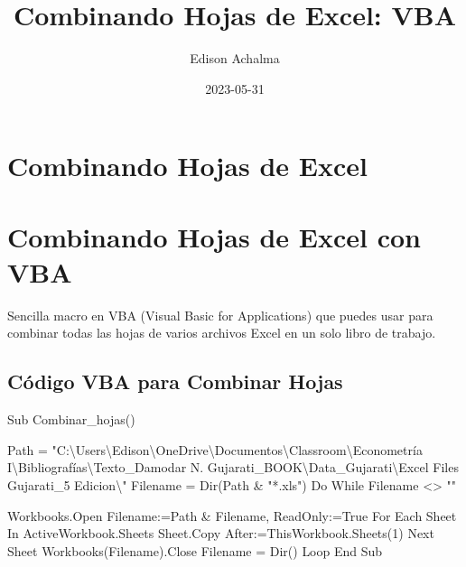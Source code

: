 \documentclass[
  jou,
  floatsintext,
  longtable,
  a4paper,
  nolmodern,
  notxfonts,
  notimes,
  colorlinks=true,linkcolor=blue,citecolor=blue,urlcolor=blue]{apa7}
\title{Combinando Hojas de Excel: VBA}
\author{Edison Achalma}
\affiliation{
{Escuela Profesional de Economía, Universidad Nacional de San Cristóbal
de Huamanga}}
\date{2023-05-31}
\newenvironment{Shaded}{\begin{snugshade}}{\end{snugshade}}
\newcommand{\NormalTok}[1]{\textcolor[rgb]{0.00,0.23,0.31}{#1}}
\begin{document}
\maketitle

\hypertarget{toc}{}
\tableofcontents
\newpage
\section[Introduction]{Combinando Hojas de Excel}

\setcounter{secnumdepth}{5}

\setlength\LTleft{0pt}


\section{Combinando Hojas de Excel con
VBA}\label{combinando-hojas-de-excel-con-vba}

Sencilla macro en VBA (Visual Basic for Applications) que puedes usar
para combinar todas las hojas de varios archivos Excel en un solo libro
de trabajo.

\subsection{Código VBA para Combinar
Hojas}\label{cuxf3digo-vba-para-combinar-hojas}

\begin{Shaded}
\begin{Highlighting}[]
\NormalTok{Sub Combinar\_hojas()}

\NormalTok{    Path = "C:\textbackslash{}Users\textbackslash{}Edison\textbackslash{}OneDrive\textbackslash{}Documentos\textbackslash{}Classroom\textbackslash{}Econometría I\textbackslash{}Bibliografías\textbackslash{}Texto\_Damodar N. Gujarati\_BOOK\textbackslash{}Data\_Gujarati\textbackslash{}Excel Files Gujarati\_5 Edicion\textbackslash{}"}
\NormalTok{    Filename = Dir(Path \& "*.xls")}
\NormalTok{    Do While Filename \textless{}\textgreater{} ""}
    
\NormalTok{        Workbooks.Open Filename:=Path \& Filename, ReadOnly:=True}
\NormalTok{        For Each Sheet In ActiveWorkbook.Sheets}
\NormalTok{            Sheet.Copy After:=ThisWorkbook.Sheets(1)}
\NormalTok{        Next Sheet}
\NormalTok{        Workbooks(Filename).Close}
\NormalTok{        Filename = Dir()}
\NormalTok{    Loop}
\NormalTok{End Sub}
\end{Highlighting}
\end{Shaded}
\end{document}
